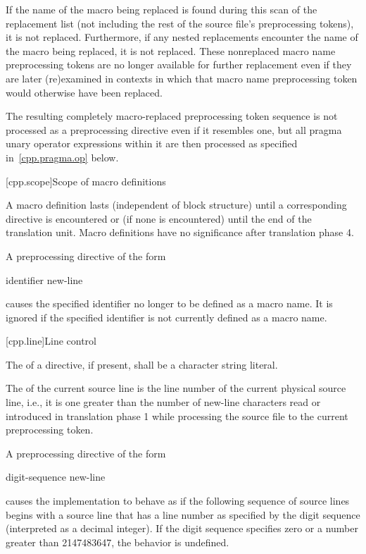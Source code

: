 \pnum
If the name of the macro being replaced is found during this scan of
the replacement list
(not including the rest of the source file's preprocessing tokens),
it is not replaced.
Furthermore,
if any nested replacements encounter the name of the macro being replaced,
it is not replaced.
These nonreplaced macro name preprocessing tokens are no longer available
for further replacement even if they are later (re)examined in contexts
in which that macro name preprocessing token would otherwise have been
replaced.

\pnum
The resulting completely macro-replaced preprocessing token sequence
is not processed as a preprocessing directive even if it resembles one,
but all pragma unary operator expressions within it are then processed as
specified in~\ref{cpp.pragma.op} below.

[cpp.scope]{Scope of macro definitions}%
%

\pnum
A macro definition lasts
(independent of block structure)
until a corresponding
directive is encountered or
(if none is encountered)
until the end of the translation unit.
Macro definitions have no significance after translation phase 4.

\pnum
A preprocessing directive of the form
\begin{ncsimplebnf}
 identifier new-line
%
\end{ncsimplebnf}
causes the specified identifier no longer to be defined as a macro name.
It is ignored if the specified identifier is not currently defined as
a macro name.


[cpp.line]{Line control}%
%

\pnum
The  of a
directive, if present,
shall be a character string literal.

\pnum
The
of the current source line is
the line number of the current physical source line,
i.e., it is one greater than
the number of new-line characters read or introduced
in translation phase 1
while processing the source file to the current preprocessing token.

\pnum
A preprocessing directive of the form
\begin{ncsimplebnf}
 digit-sequence new-line
\end{ncsimplebnf}
causes the implementation to behave as if
the following sequence of source lines begins with a
source line that has a line number as specified
by the digit sequence (interpreted as a decimal integer).
If the digit sequence specifies zero
or a number greater than 2147483647,
the behavior is undefined.

